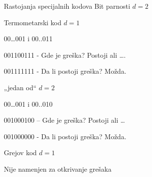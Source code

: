 \begin{frame}[label=06-s030]{Rastojanja specijalnih kodova}
\setlength{\parskip}{5pt}
Bit parnosti $d=2$\par
Termometarski kod $d=1$\par
\hspace{10mm}\begin{minipage}{.75\textwidth}
00…001 i 00..011\par
00\textcolor{DEcrvena}{11}\textcolor{DEcrvena}{00}111 - Gde je greška? Postoji ali ….\par
00\textcolor{DEcrvena}{1}111111 - Da li postoji greška? Možda.
\end{minipage}\par
„jedan od“ $d=2$\par
\hspace{10mm}\begin{minipage}{.75\textwidth}
00…001 i 00..010\par
001000100 – Gde je greška? Postoji ali …\par
00\textcolor{DEcrvena}{1}000\textcolor{DEcrvena}{0}00 - Da li postoji greška? Možda.
\end{minipage}\par
Grejov kod $d=1$\par
\hspace{10mm}Nije namenjen za otkrivanje grešaka
\end{frame}
